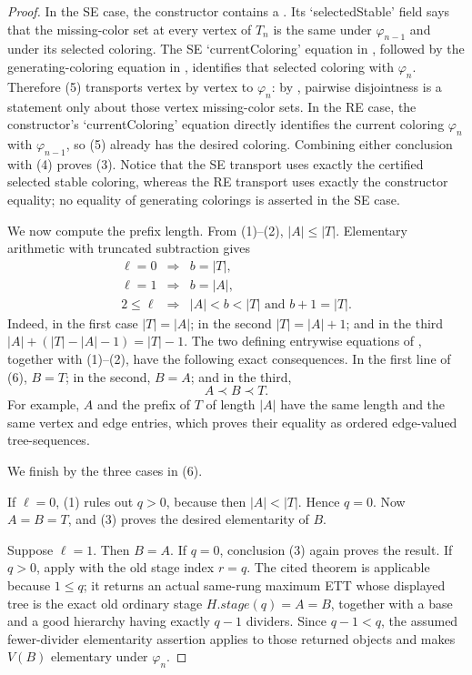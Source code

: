 \begin{proof}
In the SE case, the constructor contains a
.  Its `selectedStable' field says that
the missing-color set at every vertex of $T_n$ is the same under
$\varphi_{n-1}$ and under its selected coloring.  The SE
`currentColoring' equation in , followed by
the generating-coloring equation in
, identifies that selected coloring with
$\varphi_n$.  Therefore (5) transports vertex by vertex to
$\varphi_n$: by , pairwise
disjointness is a statement only about those vertex missing-color sets.
In the RE case, the constructor's `currentColoring'
equation directly identifies the current coloring $\varphi_n$ with
$\varphi_{n-1}$, so (5) already has the desired coloring.  Combining
either conclusion with (4) proves (3).  Notice that the SE transport
uses exactly the certified selected stable coloring, whereas the RE
transport uses exactly the constructor equality; no equality of
generating colorings is asserted in the SE case.

We now compute the prefix length.  From (1)--(2), $|A|\leq|T|$.
Elementary arithmetic with truncated subtraction gives
\[
\begin{array}{rcl}
 \ell=0&\Longrightarrow& b=|T|,\\
 \ell=1&\Longrightarrow& b=|A|,\\
 2\leq\ell&\Longrightarrow& |A|<b<|T|\text{ and }b+1=|T|.
\end{array}                                                     \tag{6}
\]
Indeed, in the first case $|T|=|A|$; in the second
$|T|=|A|+1$; and in the third
$|A|+(|T|-|A|-1)=|T|-1$.  The two defining entrywise equations of
, together with (1)--(2), have the following
exact consequences.  In the first line of (6), $B=T$; in the second,
$B=A$; and in the third,
\[
                      A\prec B\prec T.                         \tag{7}
\]
For example, $A$ and the prefix of $T$ of length $|A|$ have the same
length and the same vertex and edge entries, which proves their equality
as ordered edge-valued tree-sequences.

We finish by the three cases in (6).

If $\ell=0$, (1) rules out $q>0$, because then $|A|<|T|$.  Hence
$q=0$.  Now $A=B=T$, and (3) proves the desired elementarity of $B$.

Suppose $\ell=1$.  Then $B=A$.  If $q=0$, conclusion (3) again proves
the result.  If $q>0$, apply
 with the old stage index $r=q$.
The cited theorem is applicable because $1\leq q$; it returns an actual
same-rung maximum ETT whose displayed tree is the exact old ordinary
stage $H.\mathit{stage}(q)=A=B$, together with a base and a good
hierarchy having exactly $q-1$ dividers.  Since $q-1<q$, the assumed
fewer-divider elementarity assertion applies to those returned objects
and makes $V(B)$ elementary under $\varphi_n$.


\end{proof}
